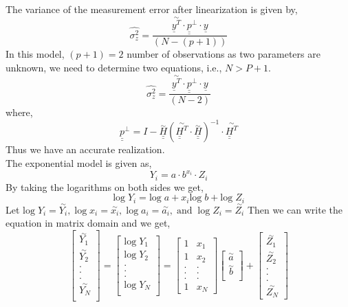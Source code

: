 \noindent The variance of the measurement error after linearization is given by,
$$\hat{\sigma_z^2} = \frac{\overset{\sim}{\underline{y}^T} \cdot \underline{\underline{p}}^{\bot}\cdot \underline{y}}{(N- (p+1))}$$
\noindent In this model, $(p + 1)= 2$ number of observations as two parameters are unknown, we need to determine two equations, i.e., $N > P+1.$
$$\hat{\sigma_z^2} =\frac{\overset{\sim}{\underline{y}^T} \cdot \underline{\underline{p}}^{\bot}\cdot \underline{y}}{(N - 2)}$$
where,
$$\underline{\underline{p}}^{\bot} = I -  \overset{\sim}{\underline{\underline{H}}} (\overset{\sim}{\underline{\underline{H}}^T}   \cdot \overset{\sim}{\underline{\underline{H}}})^{-1}  \cdot  \overset{\sim}{\underline{\underline{H}}^T} $$
\noindent Thus we have an accurate realization.\\


\noindent The exponential model is given as,
$$  Y_i = a \cdot b^{x_i} \cdot Z_i   $$
\noindent By taking the logarithms on both sides we get,
$$\text{log}\;Y_i = \text{log} \;a + x_i \text{log} \;b + \text{log} \;Z_i $$
\noindent Let $ \text{log}\; Y_i = \overset{\sim}{Y_i},\; \text{log}\; x_i = \overset{\sim}{x_i},\;\text{log}\; a_i = \overset{\sim}{a_i}, \;\text{and} \; \; \text{log}\; Z_i = \overset{\sim}{Z_i}$ 
\noindent Then we can write the equation in matrix domain and we get,
\[
\begin{bmatrix}
\overset{\sim}{Y_1}\\
\overset{\sim}{Y_2}\\
.\\
.\\
.\\
\overset{\sim}{Y_N}\\
\end{bmatrix}
=
\begin{bmatrix}
\text{log}\;Y_1 \\
\text{log}\;Y_2\\
.\\
.\\
.\\
\text{log}\;Y_N\\
\end{bmatrix}
=
\begin{bmatrix}
1 & {x_1}\\
1 & {x_2}\\
. & .\\
. & .\\
. & .\\
1 & {x_N}
\end{bmatrix}
\begin{bmatrix}
\overset{\sim}{a}\\
\overset{\sim}{b}\\
\end{bmatrix}
+\begin{bmatrix}
\overset{\sim}{Z_1}\\
\overset{\sim}{Z_2}\\
.\\
.\\
.\\
\overset{\sim}{Z_N}
\end{bmatrix}
\]
